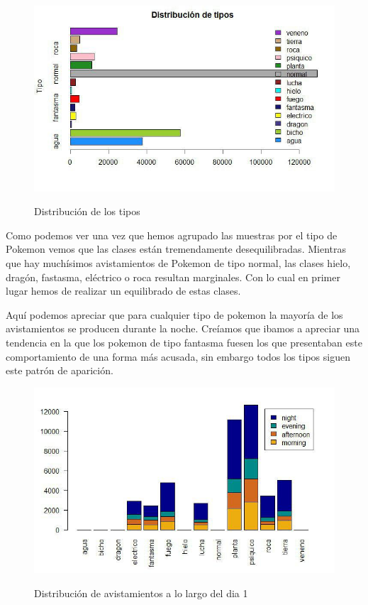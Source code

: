 \begin{figure}[H] %
\centering
\includegraphics[scale=0.8]{img/tipos.jpg}  %
\label{img/tipos.jpg}
\caption{Distribución de los tipos}
\end{figure}

Como podemos ver una vez que hemos agrupado las muestras por el tipo de Pokemon vemos que las clases están tremendamente desequilibradas. Mientras que hay muchísimos avistamientos de Pokemon de tipo normal, las clases hielo, dragón, fastasma, eléctrico o roca resultan marginales. Con lo cual en primer lugar hemos de realizar un equilibrado de estas clases.

Aquí podemos apreciar que para cualquier tipo de pokemon la mayoría de los avistamientos se producen durante la noche. Creíamos que ibamos a apreciar una tendencia en la que los pokemon de tipo fantasma fuesen los que presentaban este comportamiento de una forma más acusada, sin embargo todos los tipos siguen este patrón de aparición.

\begin{figure}[H] %
\centering
\includegraphics[scale=0.8]{img/noche1.jpg}  %
\label{img/noche1.jpg}
\caption{Distribución de avistamientos a lo largo del dia 1}
\end{figure}

